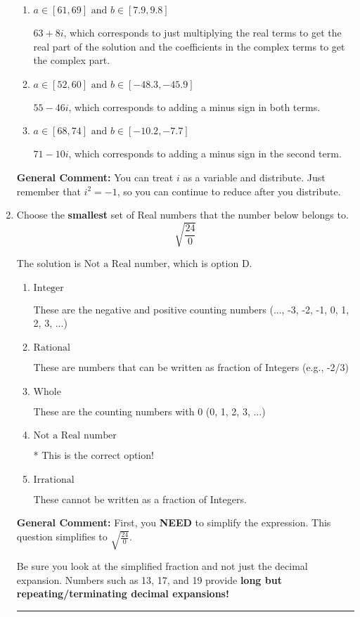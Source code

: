 \documentclass{extbook}[14pt]
\newcommand{\litem}[1]{\item #1

\rule{\textwidth}{0.4pt}}
\begin{document}
\begin{enumerate}
{\begin{enumerate}[label=\Alph*.]
 $71 + 10 i$, which corresponds to adding a minus sign in the first term.
\item \( a \in [61, 69] \text{ and } b \in [7.9, 9.8] \)

 $63 + 8 i$, which corresponds to just multiplying the real terms to get the real part of the solution and the coefficients in the complex terms to get the complex part.
\item \( a \in [52, 60] \text{ and } b \in [-48.3, -45.9] \)

 $55 - 46 i$, which corresponds to adding a minus sign in both terms.
\item \( a \in [68, 74] \text{ and } b \in [-10.2, -7.7] \)

 $71 - 10 i$, which corresponds to adding a minus sign in the second term.
\end{enumerate}

\textbf{General Comment:} You can treat $i$ as a variable and distribute. Just remember that $i^2=-1$, so you can continue to reduce after you distribute.
}
\litem{
Choose the \textbf{smallest} set of Real numbers that the number below belongs to.
\[ \sqrt{\frac{24}{0}} \]

The solution is \( \text{Not a Real number} \), which is option D.\begin{enumerate}[label=\Alph*.]
\item \( \text{Integer} \)

These are the negative and positive counting numbers (..., -3, -2, -1, 0, 1, 2, 3, ...)
\item \( \text{Rational} \)

These are numbers that can be written as fraction of Integers (e.g., -2/3)
\item \( \text{Whole} \)

These are the counting numbers with 0 (0, 1, 2, 3, ...)
\item \( \text{Not a Real number} \)

* This is the correct option!
\item \( \text{Irrational} \)

These cannot be written as a fraction of Integers.
\end{enumerate}

\textbf{General Comment:} First, you \textbf{NEED} to simplify the expression. This question simplifies to $\sqrt{\frac{24}{0}}$. 
 
 Be sure you look at the simplified fraction and not just the decimal expansion. Numbers such as 13, 17, and 19 provide \textbf{long but repeating/terminating decimal expansions!} 
 
}
\end{enumerate}
\end{document}
